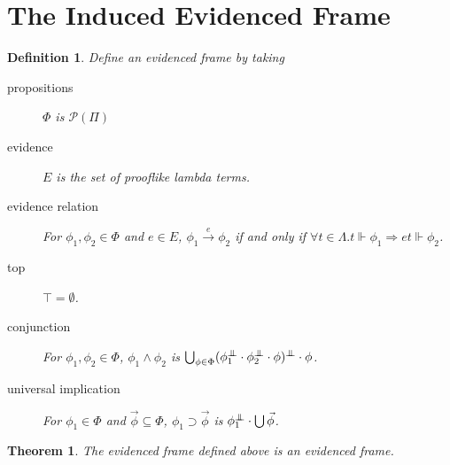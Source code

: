 \documentclass{article}
\newcommand{\pole}{{\bot\mkern-10mu\bot}}
\newcommand{\realizes}{\Vdash}
\newcommand{\powerset}[1]{\mathcal{P}(#1)}
\newtheorem{definition}{Definition}
\newtheorem{theorem}{Theorem}
\begin{document}
\section{The Induced Evidenced Frame}

\begin{definition}
    Define an evidenced frame by taking
    \begin{description}
        \item[propositions] $\Phi$ is $\powerset{\Pi}$
        \item[evidence] $E$ is the set of prooflike lambda terms.
        \item[evidence relation] For $\phi_1, \phi_2 \in \Phi$ and $e \in E$, $\phi_1 \xrightarrow{e} \phi_2$ if and only if $\forall t \in \Lambda. t \realizes \phi_1 \Rightarrow e t \realizes \phi_2$.
        \item[top] $\top = \emptyset$.
        \item[conjunction] For $\phi_1, \phi_2 \in \Phi$, $\phi_1 \wedge \phi_2$ is $\bigcup_{\phi \in \Phi} (\phi_1^\pole \cdot \phi_2^\pole \cdot \phi)^\pole \cdot \phi$.
        \item[universal implication] For $\phi_1 \in \Phi$ and $\vec\phi \subseteq \Phi$, $\phi_1 \supset \vec\phi$ is $\phi_1^\pole \cdot \bigcup \vec\phi$.
    \end{description}
\end{definition}

\begin{theorem}
    The evidenced frame defined above is an evidenced frame.
\end{theorem}
\end{document}

